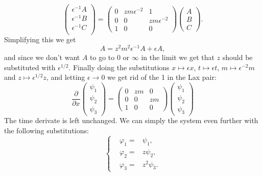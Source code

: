 \documentclass[english,master]{liumaiex}
\theoremstyle{plain}
\theoremstyle{definition}
\begin{document}
\begin{equation}
\begin{pmatrix} 
	\epsilon^{-1} A \\
	\epsilon^{-1} B \\
	\epsilon^{-1} C \\
\end{pmatrix} =
\begin{pmatrix}
	0 & zm\epsilon^{-2} & 1 \\
	0 & 0 & zm\epsilon^{-2}  \\
	1 & 0 & 0
\end{pmatrix}
\begin{pmatrix} A \\ B \\ C \end{pmatrix} .
\end{equation}
Simplifying this we get
\begin{equation}
	A = z^2m^2\epsilon^{-1}A + \epsilon A,
\end{equation}
and since we don't want $A$ to go to $0$ or $\infty$ in the limit we get that $z$ should be substituted with $\epsilon^{1/2}$.
Finally doing the substitutions $x \mapsto \epsilon x$, $t \mapsto \epsilon t$, $m \mapsto \epsilon^{-2} m$ and $z \mapsto \epsilon^{1/2}z$, and letting $\epsilon \rightarrow 0$ we get rid of the 1 in the Lax pair:
\begin{equation}
\frac{\partial}{\partial x}
\begin{pmatrix} \psi_1 \\ \psi_2 \\ \psi_3 \end{pmatrix} =
\begin{pmatrix}
	0 & zm & 0 \\
	0 & 0 & zm \\
	1 & 0 & 0
\end{pmatrix}
\begin{pmatrix} \psi_1 \\ \psi_2 \\ \psi_3 \end{pmatrix}
\end{equation}
The time derivate is left unchanged. We can simply the system even further with the following substitutions:
\begin{equation}
\left\{ \begin{aligned}
	&\varphi_1 = &\psi_1, \\
	&\varphi_2 = &z\psi_2, \\
	&\varphi_3 = &z^2\psi_3.
\end{aligned} \right.
\end{equation}
\end{document}
